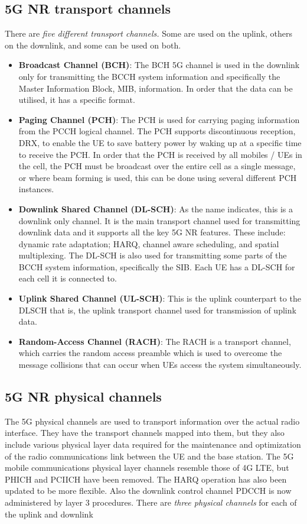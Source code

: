 \subsection{5G NR transport channels}
There are \emph{five different transport channels.} Some are used on the uplink, others on the downlink, and some can be used on both.

\begin{itemize}
    \item \textbf{Broadcast Channel (BCH)}: The BCH 5G channel is used in the downlink only for transmitting the BCCH system information and specifically the Master Information Block, MIB, information. In order that the data can be utilised, it has a specific format.
    \item \textbf{Paging Channel (PCH)}: The PCH is used for carrying paging information from the PCCH logical channel. The PCH supports discontinuous reception, DRX, to enable the UE to save battery power by waking up at a specific time to receive the PCH.
    \newline
    In order that the PCH is received by all mobiles / UEs in the cell, the PCH must be broadcast over the entire cell as a single message, or where beam forming is used, this can be done using several different PCH instances.
    \item \textbf{Downlink Shared Channel (DL-SCH)}: As the name indicates, this is a downlink only channel. It is the main transport channel used for transmitting downlink data and it supports all the key 5G NR features. These include: dynamic rate adaptation; HARQ, channel aware scheduling, and spatial multiplexing.
    \newline
    The DL-SCH is also used for transmitting some parts of the BCCH system information, specifically the SIB. Each UE has a DL-SCH for each cell it is connected to.
    \item \textbf{Uplink Shared Channel (UL-SCH)}: This is the uplink counterpart to the DLSCH that is, the uplink transport channel used for transmission of uplink data.
    \item \textbf{Random-Access Channel (RACH)}: The RACH is a transport channel, which carries the random access preamble which is used to overcome the message collisions that can occur when UEs access the system simultaneously.
\end{itemize}

\subsection{5G NR physical channels}
The 5G physical channels are used to transport information over the actual radio interface. They have the transport channels mapped into them, but they also include various physical layer data required for the maintenance and optimization of the radio communications link between the UE and the base station.
The 5G mobile communications physical layer channels resemble those of 4G LTE, but PHICH and PCIICH have been removed. The HARQ operation has also been updated to be more flexible. Also the downlink control channel PDCCH is now administered by layer 3 procedures.
There are \emph{three physical channels} for each of the uplink and downlink

